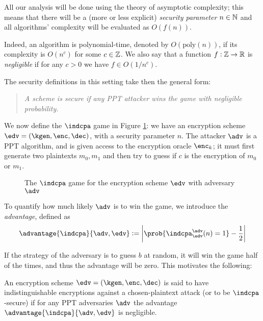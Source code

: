 All our analysis will be done using the theory of asymptotic complexity; this means that there will be a (more or less explicit) \emph{security parameter} $n\in\mathbb{N}$ and all algorithms' complexity will be evaluated as $O(f(n))$.

Indeed, an algorithm is polynomial-time, denoted by $O(\text{poly}(n))$, if its complexity is $O(n^c)$ for some $c\in\mathbb{Z}$. We also say that a function $f:\mathbb{Z}\to\mathbb{R}$ is \emph{negligible} if for any $c>0$ we have $f\in O(1/n^c)$.

The security definitions in this setting take then the general form:

\begin{quote}
    \textit{A scheme is \emph{secure} if any PPT attacker wins the game with negligible probability.}
\end{quote}

We now define the $\indcpa$ game in Figure \ref{game_indcpa}: we have an encryption scheme $\edv=(\kgen,\enc,\dec)$, with a security parameter $n$. The attacker $\adv$ is a PPT algorithm, and is given access to the encryption oracle $\enc_k$; it must first generate two plaintexts $m_0,m_1$ and then try to guess if $c$ is the encryption of $m_0$ or $m_1$.

\begin{figure}
    \caption{The $\indcpa$ game for the encryption scheme $\edv$ with adversary $\adv$}
    \label{game_indcpa}
\end{figure}

To quantify how much likely $\adv$ is to win the game, we introduce the \emph{advantage}, defined as
$$\advantage{\indcpa}{\adv,\edv}:=\left| \prob{\indcpa^\adv_\edv(n)=1}-\frac12 \right|$$

If the strategy of the adversary is to guess $b$ at random, it will win the game half of the times, and thus the advantage will be zero. This motivates the following:

\begin{definition}
    An encryption scheme $\edv=(\kgen,\enc,\dec)$ is said to have indistinguishable encryptions against a chosen-plaintext attack (or to be $\indcpa$-secure) if for any PPT adversaries $\adv$ the advantage $\advantage{\indcpa}{\adv,\edv}$ is negligible.
\end{definition}

